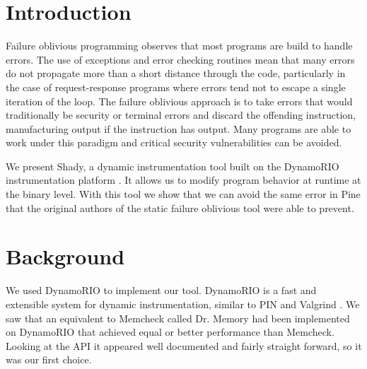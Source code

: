 \documentclass{article}
\title{\thetitle}
\author{\theauthor}
\begin{document}
\maketitle

\section{Introduction} %
\label{sec:Introduction}

Failure oblivious programming \cite{Rinard04enhancingserver} observes that most programs are build to handle errors.  The use of exceptions and error checking routines mean that many errors do not propagate more than a short distance through the code, particularly in the case of request-response programs where errors tend not to escape a single iteration of the loop.  The failure oblivious approach is to take errors that would traditionally be security or terminal errors and discard the offending instruction, manufacturing output if the instruction has output.  Many programs are able to work under this paradigm and critical security vulnerabilities can be avoided.

We present Shady, a dynamic instrumentation tool built on the DynamoRIO instrumentation platform \cite{Bruening04efficient}.  It allows us to modify program behavior at runtime at the binary level.  With this tool we show that we can avoid the same error in Pine that the original authors of the static failure oblivious tool were able to prevent.

\section{Background} %
\label{sec:Background}


We used DynamoRIO to implement our tool.  DynamoRIO is a fast and extensible system for dynamic instrumentation, similar to PIN \cite{Luk05pin:building} and Valgrind \cite{Nethercote07valgrind:a}.  We saw that an equivalent to Memcheck \cite{Nethercote05memcheck} called Dr. Memory \cite{Bruening_practicalmemory} had been implemented on DynamoRIO that achieved equal or better performance than Memcheck.  Looking at the API it appeared well documented and fairly straight forward, so it was our first choice.
\end{document}
